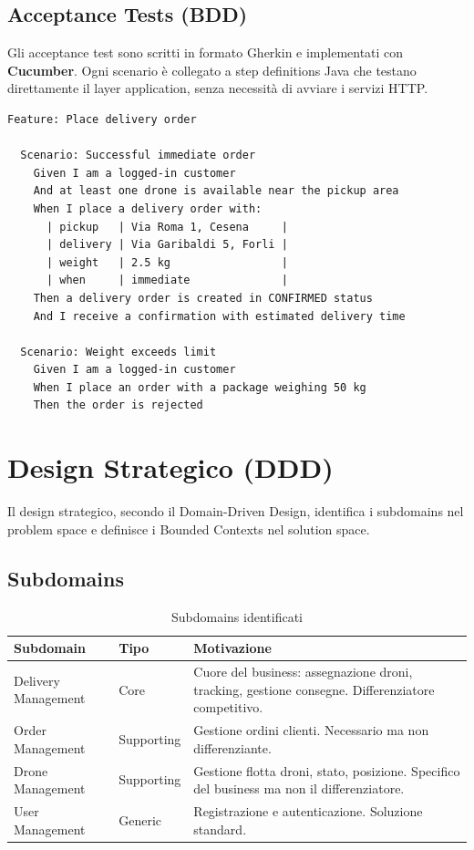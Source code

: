 \documentclass[12pt,a4paper]{article}
\begin{document}
\subsection{Acceptance Tests (BDD)}

Gli acceptance test sono scritti in formato Gherkin e implementati con \textbf{Cucumber}. Ogni scenario \`e collegato a step definitions Java che testano direttamente il layer application, senza necessit\`a di avviare i servizi HTTP.

\begin{lstlisting}[language={}]
Feature: Place delivery order

  Scenario: Successful immediate order
    Given I am a logged-in customer
    And at least one drone is available near the pickup area
    When I place a delivery order with:
      | pickup   | Via Roma 1, Cesena     |
      | delivery | Via Garibaldi 5, Forli |
      | weight   | 2.5 kg                 |
      | when     | immediate              |
    Then a delivery order is created in CONFIRMED status
    And I receive a confirmation with estimated delivery time

  Scenario: Weight exceeds limit
    Given I am a logged-in customer
    When I place an order with a package weighing 50 kg
    Then the order is rejected
\end{lstlisting}

\section{Design Strategico (DDD)}

Il design strategico, secondo il Domain-Driven Design, identifica i subdomains nel problem space e definisce i Bounded Contexts nel solution space.

\subsection{Subdomains}

\begin{table}[H]
\centering
\begin{tabularx}{\textwidth}{llX}
\toprule
\textbf{Subdomain} & \textbf{Tipo} & \textbf{Motivazione} \\
\midrule
Delivery Management & Core & Cuore del business: assegnazione droni, tracking, gestione consegne. Differenziatore competitivo. \\
Order Management & Supporting & Gestione ordini clienti. Necessario ma non differenziante. \\
Drone Management & Supporting & Gestione flotta droni, stato, posizione. Specifico del business ma non il differenziatore. \\
User Management & Generic & Registrazione e autenticazione. Soluzione standard. \\
\bottomrule
\end{tabularx}
\caption{Subdomains identificati}
\end{table}
\end{document}
